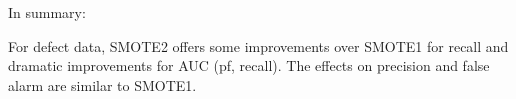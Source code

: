  





In summary:

\begin{lesson1}
    For defect data, SMOTE2  
 offers   some  improvements over SMOTE1 for recall
 and dramatic improvements for AUC (pf, recall).
 The effects on precision and false alarm are similar to SMOTE1.
\end{lesson1}


